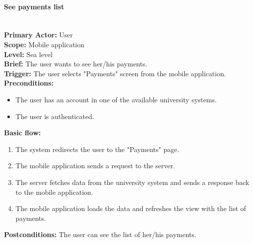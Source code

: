 \paragraph{\large{See payments list}}\mbox{}\\[2pt]
\textbf{Primary Actor:} User\\
\textbf{Scope:} Mobile application\\
\textbf{Level:} Sea level\\
\textbf{Brief:} The user wants to see her/his payments.\\
\textbf{Trigger:} The user selects "Payments" screen from the mobile application.\\
\textbf{Preconditions:}
\begin{itemize}
    \item The user has an account in one of the available university systems.
    \item The user is authenticated.
\end{itemize}
\textbf{Basic flow:}
\begin{enumerate}
    \item The system redirects the user to the "Payments" page.
    \item The mobile application sends a request to the server.
    \item The server fetches data from the university system and sends a response back to the mobile application.
    \item The mobile application loads the data and refreshes the view with the list of payments.
\end{enumerate}
\textbf{Postconditions:}
The user can see the list of her/his payments.


